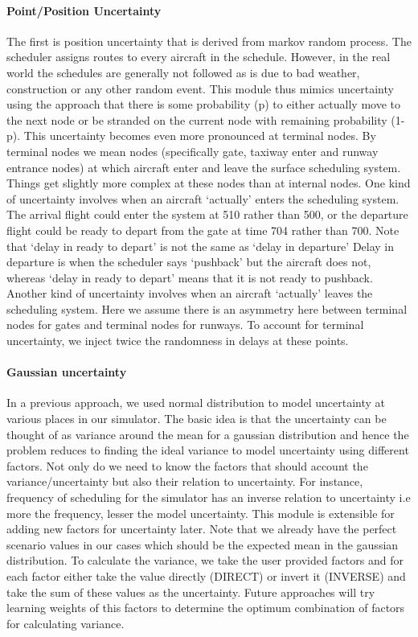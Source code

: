 \documentclass[conference]{IEEEtran}
\begin{document}
\paragraph{Point/Position Uncertainty} The first is position uncertainty that is derived from markov random process. The scheduler assigns routes to every aircraft in the schedule. However, in the real world the schedules are generally not followed as is due to bad weather, construction or any other random event. This module thus mimics uncertainty using the approach that there is some probability (p) to either actually move to the next node or be stranded on the current node with remaining probability (1-p). This uncertainty becomes even more pronounced at terminal nodes. By terminal nodes we mean nodes (specifically gate, taxiway enter and runway entrance nodes) at which aircraft enter and leave the surface scheduling system. Things get slightly more complex at these nodes than at internal nodes. One kind of uncertainty involves when an aircraft `actually' enters the scheduling system. The arrival flight could enter the system at 510 rather than 500, or the departure flight could be ready to depart from the gate at time 704 rather than 700. Note that `delay in ready to depart' is not the same as `delay in departure' Delay in departure is when the scheduler says `pushback' but the aircraft does not, whereas `delay in ready to depart' means that it is not ready to pushback. Another kind of uncertainty involves when an aircraft `actually' leaves the scheduling system. Here we assume there is an asymmetry here between terminal nodes for gates and terminal nodes for runways. To account for terminal uncertainty, we inject twice the randomness in delays at these points.


\paragraph{Gaussian uncertainty} In a previous approach, we used normal distribution to model uncertainty at various places in our simulator. The basic idea is that the uncertainty can be thought of as variance around the mean for a gaussian distribution and hence the problem reduces to finding the ideal variance to model uncertainty using different factors. Not only do we need to know the factors that should account the variance/uncertainty but also their relation to uncertainty. For instance, frequency of scheduling for the simulator has an inverse relation to uncertainty i.e more the frequency, lesser the model uncertainty. This module is extensible for adding new factors for uncertainty later. Note that we already have the perfect scenario values in our cases which should be the expected mean in the gaussian distribution. To calculate the variance, we take the user provided factors and for each factor either take the value directly (DIRECT) or invert it (INVERSE) and take the sum of these values as the uncertainty. Future approaches will try learning weights of this factors to determine the optimum combination of factors for calculating variance.
\end{document}
